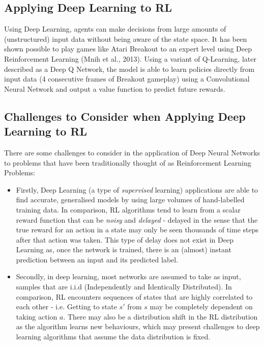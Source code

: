 \documentclass{article}
\begin{document}
\subsection{Applying Deep Learning to RL}

Using Deep Learning, agents can make decisions from large amounts of (unstructured) input data without being aware of the state space. It has been shown possible to play games like Atari Breakout to an expert level using Deep Reinforcement Learning (Mnih et al., 2013). Using a variant of Q-Learning, later described as a Deep Q Network, the model is able to learn policies directly from input data (4 consecutive frames of Breakout gameplay) using a Convolutional Neural Network and output a value function to predict future rewards. 


\subsection{Challenges to Consider when Applying Deep Learning to RL}

There are some challenges to consider in the application of Deep Neural Networks to problems that have been traditionally thought of as Reinforcement Learning Problems:

\begin{itemize}
    \item Firstly, Deep Learning (a type of \textit{supervised} learning) applications are able to find accurate, generalised models by using large volumes of hand-labelled training data. In comparison, RL algorithms tend to learn from a scalar reward function that can be \textit{noisy} and \textit{delayed} - delayed in the sense that the true reward for an action in a state may only be seen thousands of time steps after that action was taken. This type of delay does not exist in Deep Learning as, once the network is trained, there is an (almost) instant prediction between an input and its predicted label.
    
    \item Secondly, in deep learning, most networks are assumed to take as input, samples that are i.i.d (Independently and Identically Distributed). In comparison, RL encounters sequences of states that are highly correlated to each other - i.e. Getting to state $s'$ from $s$ may be completely dependent on taking action $a$. There may also be a distribution shift in the RL distribution as the algorithm learns new behaviours, which may present challenges to deep learning algorithms that assume the data distribution is fixed.
    
\end{itemize}
\end{document}
